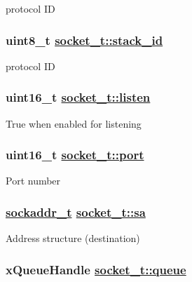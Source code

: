 protocol ID \hypertarget{structsocket__t_ac1f42ef7ee07bed7f96631b4752dabb}{
\subsubsection[stack\_\-id]{\setlength{\rightskip}{0pt plus 5cm}uint8\_\-t \hyperlink{structsocket__t_ac1f42ef7ee07bed7f96631b4752dabb}{socket\_\-t::stack\_\-id}}}
\label{structsocket__t_ac1f42ef7ee07bed7f96631b4752dabb}


protocol ID \hypertarget{structsocket__t_367f8e34a0abb424055cc8fcb3388705}{
\subsubsection[listen]{\setlength{\rightskip}{0pt plus 5cm}uint16\_\-t \hyperlink{structsocket__t_367f8e34a0abb424055cc8fcb3388705}{socket\_\-t::listen}}}
\label{structsocket__t_367f8e34a0abb424055cc8fcb3388705}


True when enabled for listening \hypertarget{structsocket__t_584532d6d7f8a88d0b8e5b263dba7621}{
\subsubsection[port]{\setlength{\rightskip}{0pt plus 5cm}uint16\_\-t \hyperlink{structsocket__t_584532d6d7f8a88d0b8e5b263dba7621}{socket\_\-t::port}}}
\label{structsocket__t_584532d6d7f8a88d0b8e5b263dba7621}


Port number \hypertarget{structsocket__t_dd056ea6adc14e1cb056e3195ee540c2}{
\subsubsection[sa]{\setlength{\rightskip}{0pt plus 5cm}\hyperlink{structsockaddr__t}{sockaddr\_\-t} \hyperlink{structsocket__t_dd056ea6adc14e1cb056e3195ee540c2}{socket\_\-t::sa}}}
\label{structsocket__t_dd056ea6adc14e1cb056e3195ee540c2}


Address structure (destination) \hypertarget{structsocket__t_6fdb7e88bf89a5bc524a576a7b2a2ac8}{
\subsubsection[queue]{\setlength{\rightskip}{0pt plus 5cm}x\-Queue\-Handle \hyperlink{structsocket__t_6fdb7e88bf89a5bc524a576a7b2a2ac8}{socket\_\-t::queue}}}
\label{structsocket__t_6fdb7e88bf89a5bc524a576a7b2a2ac8}


